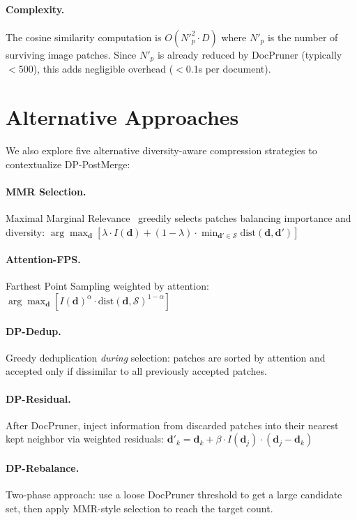 \documentclass[11pt]{article}
\begin{document}
\paragraph{Complexity.}
The cosine similarity computation is $O(N'^2_p \cdot D)$ where $N'_p$ is the number of surviving image patches.
Since $N'_p$ is already reduced by DocPruner (typically $<$500), this adds negligible overhead ($<$0.1s per document).


\section{Alternative Approaches}

We also explore five alternative diversity-aware compression strategies to contextualize DP-PostMerge:

\paragraph{MMR Selection.}
Maximal Marginal Relevance~\cite{carbonell1998mmr} greedily selects patches balancing importance and diversity:
$\arg\max_{\mathbf{d}} [\lambda \cdot I(\mathbf{d}) + (1-\lambda) \cdot \min_{\mathbf{d}' \in \mathcal{S}} \text{dist}(\mathbf{d}, \mathbf{d}')]$

\paragraph{Attention-FPS.}
Farthest Point Sampling weighted by attention:
$\arg\max_{\mathbf{d}} [I(\mathbf{d})^\alpha \cdot \text{dist}(\mathbf{d}, \mathcal{S})^{1-\alpha}]$

\paragraph{DP-Dedup.}
Greedy deduplication \emph{during} selection: patches are sorted by attention and accepted only if dissimilar to all previously accepted patches.

\paragraph{DP-Residual.}
After DocPruner, inject information from discarded patches into their nearest kept neighbor via weighted residuals:
$\mathbf{d}'_k = \mathbf{d}_k + \beta \cdot I(\mathbf{d}_j) \cdot (\mathbf{d}_j - \mathbf{d}_k)$

\paragraph{DP-Rebalance.}
Two-phase approach: use a loose DocPruner threshold to get a large candidate set, then apply MMR-style selection to reach the target count.
\end{document}
